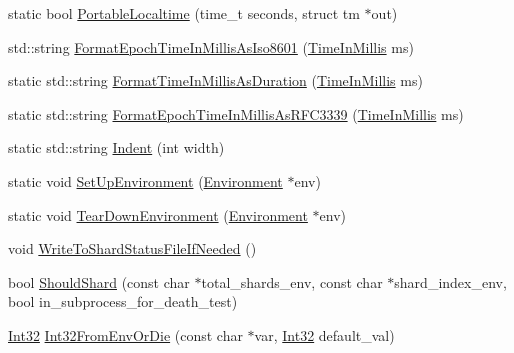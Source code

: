 \begin{DoxyCompactItemize}
\item 
static bool \mbox{\hyperlink{namespacetesting_1_1internal_a60af94307ed4f00a57b5c6d9617c046d}{Portable\+Localtime}} (time\+\_\+t seconds, struct tm $\ast$out)
\item 
std\+::string \mbox{\hyperlink{namespacetesting_1_1internal_a5ef227c4a610e7ff638b12dfb25b068e}{Format\+Epoch\+Time\+In\+Millis\+As\+Iso8601}} (\mbox{\hyperlink{namespacetesting_1_1internal_a66a845df404b38fe85c5e14a069f255a}{Time\+In\+Millis}} ms)
\item 
static std\+::string \mbox{\hyperlink{namespacetesting_1_1internal_ac5d8478622cc559ab7d4af98f227cd3d}{Format\+Time\+In\+Millis\+As\+Duration}} (\mbox{\hyperlink{namespacetesting_1_1internal_a66a845df404b38fe85c5e14a069f255a}{Time\+In\+Millis}} ms)
\item 
static std\+::string \mbox{\hyperlink{namespacetesting_1_1internal_abe5a476b315f310d94ecdc72c3a48d1e}{Format\+Epoch\+Time\+In\+Millis\+As\+R\+F\+C3339}} (\mbox{\hyperlink{namespacetesting_1_1internal_a66a845df404b38fe85c5e14a069f255a}{Time\+In\+Millis}} ms)
\item 
static std\+::string \mbox{\hyperlink{namespacetesting_1_1internal_a526310e5f134c88eb3c2be03ae95b85f}{Indent}} (int width)
\item 
static void \mbox{\hyperlink{namespacetesting_1_1internal_a5f5535012d4548788a5d1a4e0f18e19e}{Set\+Up\+Environment}} (\mbox{\hyperlink{classtesting_1_1Environment}{Environment}} $\ast$env)
\item 
static void \mbox{\hyperlink{namespacetesting_1_1internal_ac467e871e4781da3f5ebed2a4465aec4}{Tear\+Down\+Environment}} (\mbox{\hyperlink{classtesting_1_1Environment}{Environment}} $\ast$env)
\item 
void \mbox{\hyperlink{namespacetesting_1_1internal_a19b35b39782d41e6ef76e1910a3a502e}{Write\+To\+Shard\+Status\+File\+If\+Needed}} ()
\item 
bool \mbox{\hyperlink{namespacetesting_1_1internal_a8688e48645d951b8e42b61d2e4b2890e}{Should\+Shard}} (const char $\ast$total\+\_\+shards\+\_\+env, const char $\ast$shard\+\_\+index\+\_\+env, bool in\+\_\+subprocess\+\_\+for\+\_\+death\+\_\+test)
\item 
\mbox{\hyperlink{namespacetesting_1_1internal_a8ee38faaf875f133358abaf9bc056cec}{Int32}} \mbox{\hyperlink{namespacetesting_1_1internal_a7e70cddd54da21e2c2608613d51288e2}{Int32\+From\+Env\+Or\+Die}} (const char $\ast$var, \mbox{\hyperlink{namespacetesting_1_1internal_a8ee38faaf875f133358abaf9bc056cec}{Int32}} default\+\_\+val)
\item 

\end{DoxyCompactItemize}
